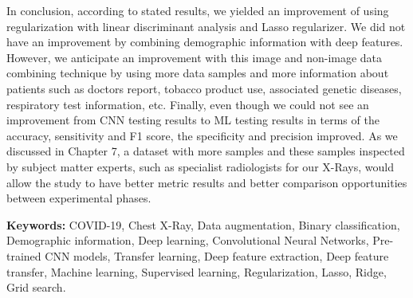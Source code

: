 In conclusion, according to stated results, we yielded an improvement of using regularization with linear discriminant analysis and Lasso regularizer. We did not have an improvement by combining demographic information with deep features. However, we anticipate an improvement with this image and non-image data combining technique by using more data samples and more information about patients such as doctors report, tobacco product use, associated genetic diseases, respiratory test information, etc. Finally, even though we could not see an improvement from CNN testing results to ML testing results in terms of the accuracy, sensitivity and F1 score, the specificity and precision improved. As we discussed in Chapter 7, a dataset with more samples and these samples inspected by subject matter experts, such as specialist radiologists for our X-Rays, would allow the study to have better metric results and better comparison opportunities between experimental phases.

\textbf{Keywords:} COVID-19, Chest X-Ray, Data augmentation, Binary classification, Demographic information, Deep learning, Convolutional Neural Networks, Pre-trained CNN models, Transfer learning, Deep feature extraction, Deep feature transfer, Machine learning, Supervised learning, Regularization, Lasso, Ridge, Grid search.